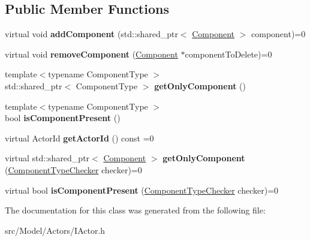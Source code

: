 \subsection*{Public Member Functions}
\begin{DoxyCompactItemize}
\item 
virtual void {\bfseries add\+Component} (std\+::shared\+\_\+ptr$<$ \hyperlink{classComponent}{Component} $>$ component)=0\hypertarget{classIActor_a406c89af95f0c6abf42b3ac07a15dd08}{}\label{classIActor_a406c89af95f0c6abf42b3ac07a15dd08}

\item 
virtual void {\bfseries remove\+Component} (\hyperlink{classComponent}{Component} $\ast$component\+To\+Delete)=0\hypertarget{classIActor_a75401386ddb0b7bec49d1f5b3c9d137c}{}\label{classIActor_a75401386ddb0b7bec49d1f5b3c9d137c}

\item 
{\footnotesize template$<$typename Component\+Type $>$ }\\std\+::shared\+\_\+ptr$<$ Component\+Type $>$ {\bfseries get\+Only\+Component} ()\hypertarget{classIActor_a096d0f46b11274b8e0154080b18c5ea4}{}\label{classIActor_a096d0f46b11274b8e0154080b18c5ea4}

\item 
{\footnotesize template$<$typename Component\+Type $>$ }\\bool {\bfseries is\+Component\+Present} ()\hypertarget{classIActor_a47e7c67883c9207eb2080a4c6aa9c100}{}\label{classIActor_a47e7c67883c9207eb2080a4c6aa9c100}

\item 
virtual Actor\+Id {\bfseries get\+Actor\+Id} () const  =0\hypertarget{classIActor_a5a7d30292e74b082145ab74320fae7e5}{}\label{classIActor_a5a7d30292e74b082145ab74320fae7e5}

\item 
virtual std\+::shared\+\_\+ptr$<$ \hyperlink{classComponent}{Component} $>$ {\bfseries get\+Only\+Component} (\hyperlink{classComponentTypeChecker}{Component\+Type\+Checker} checker)=0\hypertarget{classIActor_ae363a172564fa4ed555e486fc4770350}{}\label{classIActor_ae363a172564fa4ed555e486fc4770350}

\item 
virtual bool {\bfseries is\+Component\+Present} (\hyperlink{classComponentTypeChecker}{Component\+Type\+Checker} checker)=0\hypertarget{classIActor_a31d4e5d91cf2ec4c6a8fff033a04290c}{}\label{classIActor_a31d4e5d91cf2ec4c6a8fff033a04290c}

\end{DoxyCompactItemize}


The documentation for this class was generated from the following file\+:\begin{DoxyCompactItemize}
\item 
src/\+Model/\+Actors/I\+Actor.\+h\end{DoxyCompactItemize}
